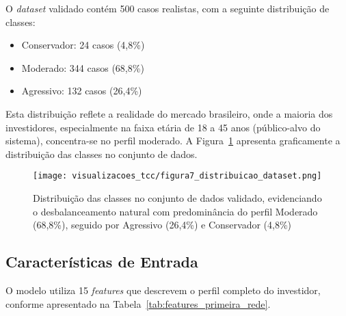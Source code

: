 O \textit{dataset} validado contém 500 casos realistas, com a seguinte distribuição de classes:
\begin{itemize}
    \item Conservador: 24 casos (4,8\%)
    \item Moderado: 344 casos (68,8\%)
    \item Agressivo: 132 casos (26,4\%)
\end{itemize}

Esta distribuição reflete a realidade do mercado brasileiro, onde a maioria dos investidores, especialmente na faixa etária de 18 a 45 anos (público-alvo do sistema), concentra-se no perfil moderado. A Figura~\ref{fig:distribuicao_dataset} apresenta graficamente a distribuição das classes no conjunto de dados.

\begin{figure}[htbp]
    \centering
    \texttt{[image: visualizacoes\_tcc/figura7\_distribuicao\_dataset.png]}
    \caption{Distribuição das classes no conjunto de dados validado, evidenciando o desbalanceamento natural com predominância do perfil Moderado (68,8\%), seguido por Agressivo (26,4\%) e Conservador (4,8\%)}
    \label{fig:distribuicao_dataset}
\end{figure}

\subsection{Características de Entrada}

O modelo utiliza 15 \textit{features} que descrevem o perfil completo do investidor, conforme apresentado na Tabela~\ref{tab:features_primeira_rede}.

